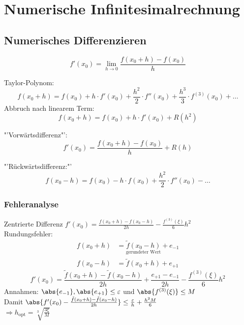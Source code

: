 \chapter{Numerische Infinitesimalrechnung}

\section{Numerisches Differenzieren}

\begin{equation}
	f'(x_0) = \lim\limits_{h\rightarrow 0} \frac{f(x_0 + h) - f(x_0)}{h}
\end{equation}

Taylor-Polynom: \[ f(x_0 + h) = f(x_0) + h\cdot f'(x_0) + \frac{h^2}{2} \cdot f''(x_0) + \frac{h^3}{3}\cdot f^{(3)}(x_0) + \ldots\]
Abbruch nach linearem Term: \[f(x_0+h) = f(x_0) + h\cdot f'(x_0) + R(h^2)\]

"'Vorwärtsdifferenz"':
\begin{equation}
	f'(x_0) = \frac{f(x_0 + h) - f(x_0)}{h} + R(h)
\end{equation}

"'Rückwärtsdifferenz:"'
\begin{equation}
	f(x_0 - h) = f(x_0) - h \cdot f(x_0) + \frac{h^2}{2} \cdot f''(x_0) - \ldots
\end{equation}

\subsection{Fehleranalyse}
Zentrierte Differenz $f'(x_0) = \frac{f(x_0+h) - f(x_0-h)}{2h} - \frac{f^{(3)}(\xi)}{6}h^2$\\
Rundungsfehler:
\begin{equation}
\begin{split}
f(x_0+h) &= \underset{\text{gerundeter Wert}}{\tilde{f}(x_0-h)} + e_{-1}\\
f(x_0-h) &= \tilde{f}(x_0+h) + e_{+1}
\end{split}
\end{equation}
\begin{equation}
f'(x_0) = \frac{\tilde{f}(x_0+h) - \tilde{f}(x_0-h)}{2h} + \frac{e_{+1} - e_{-1}}{2h} - \frac{f^{(3)}(\xi)}{6}h^2
\end{equation}
Annahmen: $\abs{e_{-1}},\abs{e_{+1}} \leq\varepsilon$ und $\abs{f^{(3)}(\xi)} \leq M$\\
Damit $\abs{f'(x_0) - \frac{\tilde{f}(x_0+h) - \tilde{f}(x_0-h)}{2h}} \leq\frac{\varepsilon}{h} + \frac{h^2M}{6}$\\
$\Rightarrow h_{\text{opt}} = \sqrt[3]{\frac{3\xi}{M}}$

